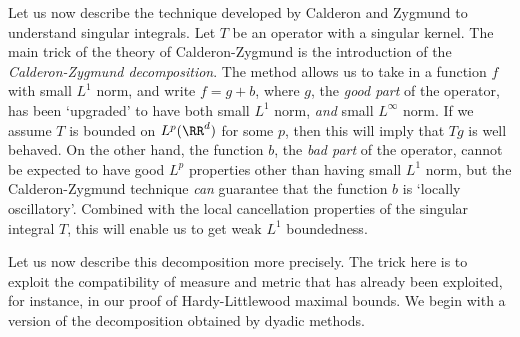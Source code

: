 Let us now describe the technique developed by Calderon and Zygmund to understand singular integrals. Let $T$ be an operator with a singular kernel. The main trick of the theory of Calderon-Zygmund is the introduction of the \emph{Calderon-Zygmund decomposition}. The method allows us to take in a function $f$ with small $L^1$ norm, and write $f = g + b$, where $g$, the \emph{good part} of the operator, has been `upgraded' to have both small $L^1$ norm, \emph{and} small $L^\infty$ norm. If we assume $T$ is bounded on $L^p(\RR^d)$ for some $p$, then this will imply that $Tg$ is well behaved. On the other hand, the function $b$, the \emph{bad part} of the operator, cannot be expected to have good $L^p$ properties other than having small $L^1$ norm, but the Calderon-Zygmund technique \emph{can} guarantee that the function $b$ is `locally oscillatory'. Combined with the local cancellation properties of the singular integral $T$, this will enable us to get weak $L^1$ boundedness.

Let us now describe this decomposition more precisely. The trick here is to exploit the compatibility of measure and metric that has already been exploited, for instance, in our proof of Hardy-Littlewood maximal bounds. We begin with a version of the decomposition obtained by dyadic methods.

